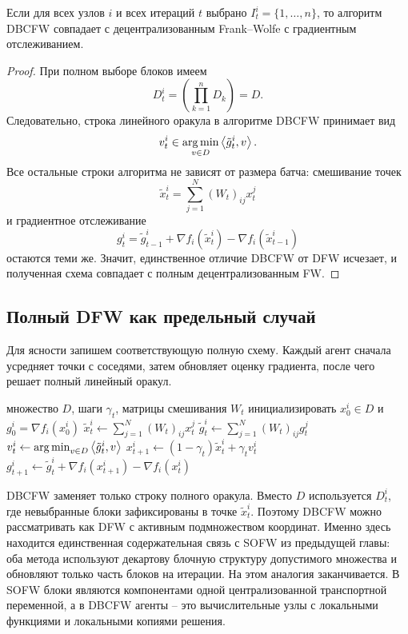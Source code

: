 \begin{proposition}
\label{prop:dbcfw-to-dfw}
Если для всех узлов $i$ и всех итераций $t$ выбрано $I_t^i=\{1,\ldots,n\}$,
то алгоритм DBCFW совпадает с децентрализованным Frank--Wolfe с градиентным
отслеживанием.
\end{proposition}

\begin{proof}
При полном выборе блоков имеем
\[
    D_t^i
    =
    \left(\prod_{k=1}^{n}D_k\right)=D.
\]
Следовательно, строка линейного оракула в алгоритме DBCFW принимает вид
\[
    v_t^i
    \in
    \operatorname*{arg\,min}_{v\in D}\left\langle \tilde g_t^i, v \right\rangle.
\]
Все остальные строки алгоритма не зависят от размера батча:
смешивание точек
\[
    \tilde x_t^i=\sum_{j=1}^{N}(W_t)_{ij}x_t^j
\]
и градиентное отслеживание
\[
    g_t^i=
    \tilde g_{t-1}^i+
    \nabla f_i(\tilde x_t^i)-
    \nabla f_i(\tilde x_{t-1}^i)
\]
остаются теми же.
Значит, единственное отличие DBCFW от DFW исчезает, и полученная схема совпадает с
полным децентрализованным FW.
\end{proof}

\subsection{Полный DFW как предельный случай}

Для ясности запишем соответствующую полную схему.
Каждый агент сначала усредняет точки с соседями, затем обновляет оценку градиента,
после чего решает полный линейный оракул.

\begin{algorithm}
\caption{Decentralized Frank--Wolfe с градиентным отслеживанием}
\label{alg:dfw-full}
\begin{algorithmic}
\REQUIRE множество $D$, шаги $\gamma_t$, матрицы смешивания $W_t$
\STATE инициализировать $x_0^i\in D$ и $g_0^i=\nabla f_i(x_0^i)$
\STATE $\tilde x_t^i\gets\sum_{j=1}^{N}(W_t)_{ij}x_t^j$
\STATE $\tilde g_t^i\gets\sum_{j=1}^{N}(W_t)_{ij}g_t^j$
\STATE $v_t^i\gets\operatorname*{arg\,min}_{v\in D}\left\langle \tilde g_t^i, v \right\rangle$
\STATE $x_{t+1}^i\gets(1-\gamma_t)\tilde x_t^i+\gamma_tv_t^i$
\STATE $g_{t+1}^i\gets \tilde g_t^i+\nabla f_i(x_{t+1}^i)-\nabla f_i(x_t^i)$
\ENDFOR
\ENDFOR
\end{algorithmic}
\end{algorithm}

DBCFW заменяет только строку полного оракула.
Вместо $D$ используется $D_t^i$, где невыбранные блоки зафиксированы в точке
$\tilde x_t^i$.
Поэтому DBCFW можно рассматривать как DFW с активным подмножеством координат.
Именно здесь находится единственная содержательная связь с SOFW из предыдущей главы:
оба метода используют декартову блочную структуру допустимого множества и обновляют только
часть блоков на итерации.
На этом аналогия заканчивается.
В SOFW блоки являются компонентами одной централизованной транспортной переменной, а в DBCFW
агенты -- это вычислительные узлы с локальными функциями и локальными копиями решения.

